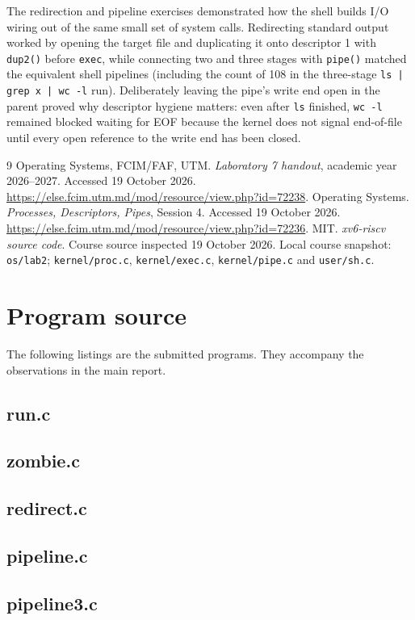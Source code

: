 \documentclass{assets/utmreport}
\begin{document}
The redirection and pipeline exercises demonstrated how the shell builds I/O wiring out of the same small set of system calls. Redirecting standard output worked by opening the target file and duplicating it onto descriptor 1 with \texttt{dup2()} before \texttt{exec}, while connecting two and three stages with \texttt{pipe()} matched the equivalent shell pipelines (including the count of 108 in the three-stage \texttt{ls | grep x | wc -l} run). Deliberately leaving the pipe's write end open in the parent proved why descriptor hygiene matters: even after \texttt{ls} finished, \texttt{wc -l} remained blocked waiting for EOF because the kernel does not signal end-of-file until every open reference to the write end has been closed.
\begin{thebibliography}{9}
 Operating Systems, FCIM/FAF, UTM. \textit{Laboratory 7 handout}, academic year 2026--2027. Accessed 19 October 2026. \url{https://else.fcim.utm.md/mod/resource/view.php?id=72238}.
 Operating Systems. \textit{Processes, Descriptors, Pipes}, Session 4. Accessed 19 October 2026. \url{https://else.fcim.utm.md/mod/resource/view.php?id=72236}.
 MIT. \textit{xv6-riscv source code}. Course source inspected 19 October 2026. Local course snapshot: \texttt{os/lab2}; \texttt{kernel/proc.c}, \texttt{kernel/exec.c}, \texttt{kernel/pipe.c} and \texttt{user/sh.c}.
\end{thebibliography}
\appendix
\chapter{Program source}
The following listings are the submitted programs. They accompany the observations in the main report.


\section{run.c}


\section{zombie.c}


\section{redirect.c}


\section{pipeline.c}


\section{pipeline3.c}

\end{document}
